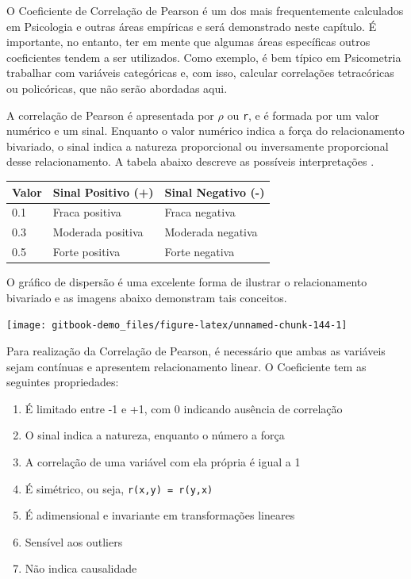 \documentclass[
]{book}
\providecommand{\tightlist}{%
  \setlength{\itemsep}{0pt}\setlength{\parskip}{0pt}}
\begin{document}
O Coeficiente de Correlação de Pearson é um dos mais frequentemente calculados em Psicologia e outras áreas empíricas e será demonstrado neste capítulo. É importante, no entanto, ter em mente que algumas áreas específicas outros coeficientes tendem a ser utilizados. Como exemplo, é bem típico em Psicometria trabalhar com variáveis categóricas e, com isso, calcular correlações tetracóricas ou policóricas, que não serão abordadas aqui.

A correlação de Pearson é apresentada por \(\rho\) ou \texttt{r}, e é formada por um valor numérico e um sinal. Enquanto o valor numérico indica a força do relacionamento bivariado, o sinal indica a natureza proporcional ou inversamente proporcional desse relacionamento. A tabela abaixo descreve as possíveis interpretações \citep{Cohen1988}.

\begin{longtable}[]{@{}lll@{}}
\toprule
Valor & Sinal Positivo (+) & Sinal Negativo (-) \\
\midrule
\endhead
0.1 & Fraca positiva & Fraca negativa \\
0.3 & Moderada positiva & Moderada negativa \\
0.5 & Forte positiva & Forte negativa \\
\bottomrule
\end{longtable}

O gráfico de dispersão é uma excelente forma de ilustrar o relacionamento bivariado e as imagens abaixo demonstram tais conceitos.

\begin{center}\texttt{[image: gitbook-demo\_files/figure-latex/unnamed-chunk-144-1]} \end{center}

Para realização da Correlação de Pearson, é necessário que ambas as variáveis sejam contínuas e apresentem relacionamento linear. O Coeficiente tem as seguintes propriedades:

\begin{enumerate}
\def\labelenumi{\arabic{enumi}.}
\tightlist
\item
  É limitado entre -1 e +1, com 0 indicando ausência de correlação\\
\item
  O sinal indica a natureza, enquanto o número a força\\
\item
  A correlação de uma variável com ela própria é igual a 1\\
\item
  É simétrico, ou seja, \texttt{r(x,y)\ =\ r(y,x)}\\
\item
  É adimensional e invariante em transformações lineares\\
\item
  Sensível aos outliers\\
\item
  Não indica causalidade
\end{enumerate}
\end{document}
